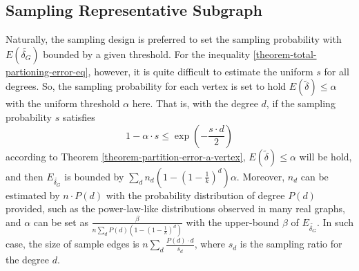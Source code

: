 \documentclass{sig-alternate-2013}
\begin{document}
\subsection{Sampling Representative Subgraph }

Naturally, the sampling design is preferred to set the sampling probability with $E(\tilde{\delta_G})$ bounded by a given threshold.
For the inequality \eqref{theorem-total-partioning-error-eq}, however, it is quite difficult to estimate the uniform $s$ for all degrees.
So, the sampling probability for each vertex is set to hold $E(\tilde\delta)\leq \alpha $ with the uniform threshold $\alpha$ here. That is,
with the degree $d$, if the sampling probability $s$ satisfies
\begin{equation}\label{theorm-sampling-prob-eq}
1-\alpha \cdot s \leq \exp{(-\frac{s \cdot d}{2})}
\end{equation}
according to Theorem \ref{theorem-partition-error-a-vertex}, $E(\tilde\delta) \leq \alpha$ will be hold,
and then $E_{\tilde{\delta_G}}$ is bounded by $\sum_{d} {n_d} {(1-(1-\frac{1}{k})^d) \alpha}$.
Moreover, $n_d$ can be estimated by $n \cdot P(d)$ with the probability distribution of degree $P(d)$ provided, such as the power-law-like distributions observed in many real graphs, and $\alpha$ can be set as $\frac{\beta}{n\sum_{d} {P(d)} {(1-(1-\frac{1}{k})^d)}} $ with the upper-bound $\beta$ of $E_{\tilde{\delta_G}}$.
In such case, the size of sample edges is $n \sum_{d}{\frac {P(d) \cdot d}{s_d}} $, where $s_d$ is the sampling ratio for the degree $d$.
\end{document}
